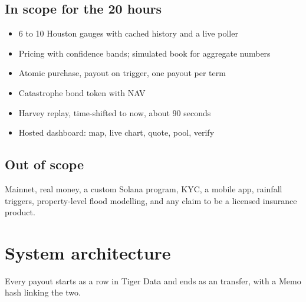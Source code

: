 \documentclass[11pt]{article}
\newcommand{\code}[1]{\texttt{\detokenize{#1}}}
\begin{document}
\subsection{In scope for the 20 hours}
\begin{itemize}
\item 6 to 10 Houston gauges with cached history and a live poller
\item Pricing with confidence bands; simulated book for aggregate numbers
\item Atomic purchase, payout on trigger, one payout per term
\item Catastrophe bond token with NAV
\item Harvey replay, time-shifted to now, about 90 seconds
\item Hosted dashboard: map, live chart, quote, pool, verify
\end{itemize}

\subsection{Out of scope}
Mainnet, real money, a custom Solana program, KYC, a mobile app, rainfall triggers, property-level flood modelling, and any claim to be a licensed insurance product.

\section{System architecture}

Every payout starts as a row in Tiger Data and ends as an \code{aUSD} transfer, with a Memo hash linking the two.
\end{document}
